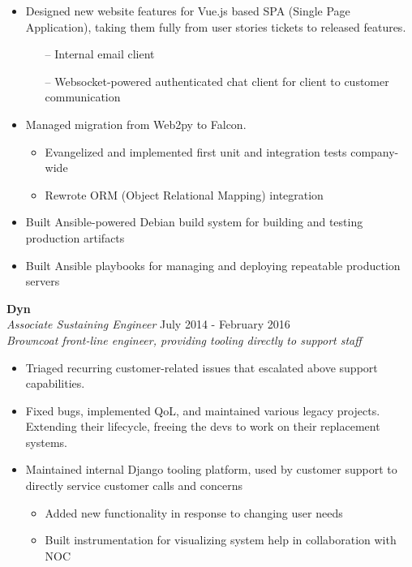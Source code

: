 \begin{itemize}
  \item Designed new website features for Vue.js based SPA (Single Page Application), taking them fully from user stories tickets to released features.
    \begin{itemize}
      \item[--] Internal email client
      \item[--] Websocket-powered authenticated chat client for client to customer communication
    \end{itemize}
  \item Managed migration from Web2py to Falcon.
    \begin{itemize}
      \item Evangelized and implemented first unit and integration tests company-wide
      \item Rewrote ORM (Object Relational Mapping) integration
    \end{itemize}
  \item Built Ansible-powered Debian build system for building and testing production artifacts
  \item Built Ansible playbooks for managing and deploying repeatable production servers
\end{itemize}

\begin{minipage}{\textwidth}
  \large{\textbf{Dyn}} \\
  \textit{Associate Sustaining Engineer} \hfill July 2014 - February 2016 \\[3.75pt]
  \textit{Browncoat front-line engineer, providing tooling directly to support staff}
\end{minipage}

\begin{itemize}
  \item Triaged recurring customer-related issues that escalated above support capabilities.
  \item Fixed bugs, implemented QoL, and maintained various legacy projects. Extending their lifecycle, freeing the devs to work on their replacement systems.
  \item Maintained internal Django tooling platform, used by customer support to directly service customer calls and concerns
    \begin{itemize}
      \item Added new functionality in response to changing user needs
      \item Built instrumentation for visualizing system help in collaboration with NOC
    \end{itemize}
\end{itemize}
